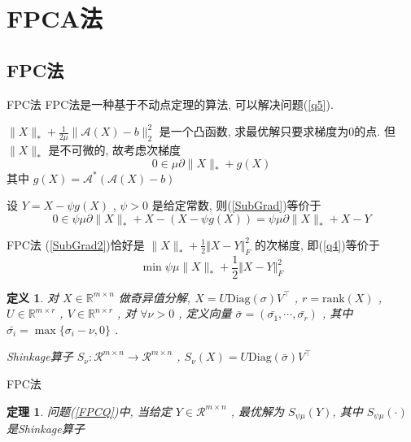 \documentclass[slidestop,compress,mathserif,UTF8]{beamer}
\newtheorem{theo}{\bf \textcolor[rgb]{0.8,0,0}{定理}}[section]  %
\newtheorem{define}{\bf \textcolor[rgb]{0.8,0,0}{定义}}[section]
\numberwithin{equation}{section}
\begin{document}
    \section{FPCA法}\label{section4}
        \subsection{FPC法}        
            \begin{frame}[t]{FPC法}
                FPC法是一种基于不动点定理的算法, 可以解决问题(\ref{q5}).

                $\lVert{X}\rVert_*+\frac{1}{2\mu}\lVert{\mathcal{A}(X)-b}\rVert_2^2$ 是一个凸函数, 求最优解只要求梯度为0的点. 但 $\lVert{X}\rVert_*$ 是不可微的, 故考虑次梯度
                \begin{equation}\label{SubGrad}
                    0 \in \mu \partial \lVert{X}\rVert_* + g(X)
                \end{equation}
                \small{其中 $g(X) = \mathcal{A}^*(\mathcal{A}(X) - b)$}\normalsize

                设 $Y = X - \psi g(X)$ , $\psi > 0$ 是给定常数, 则(\ref{SubGrad})等价于
                \begin{equation}\label{SubGrad2}
                    0 \in \psi \mu \partial \lVert{X}\rVert_* + X - (X - \psi g(X)) = \psi \mu \partial \lVert{X}\rVert_* + X -Y
                \end{equation}
            \end{frame}
            \begin{frame}[t]{FPC法}
                (\ref{SubGrad2})恰好是 $\lVert{X}\rVert_* + \frac{1}{2} \Vert{X - Y}\Vert^2_F$ 的次梯度, 即(\ref{q4})等价于 
                \begin{equation}\label{FPCQ}
                    \min \psi \mu \lVert{X}\rVert_* + \frac{1}{2} \Vert{X - Y}\Vert^2_F
                \end{equation}

                \begin{define}
                    对 $X \in \mathbb{R}^{m \times n}$ 做奇异值分解, $X = U \text{Diag}(\sigma) V ^\top$ , $r = \text{rank}(X)$ , $U \in \mathbb{R}^{m \times r}$ , $V \in \mathbb{R}^{n \times r}$ , 对 $\forall \nu > 0$ , 定义向量 $\bar{\sigma} = (\bar{\sigma_1}, \cdots, \bar{\sigma_r})$ , 其中$\bar{\sigma_i} = \max \{\sigma_i - \nu, 0\}$ .
                    
                    Shinkage算子 $S_\nu: \mathcal{R}^{m \times n} \rightarrow \mathcal{R}^{m \times n}$ , $S_\nu(X) = U \text{Diag}(\bar{\sigma}) V ^\top$
                \end{define}
            \end{frame}
            \begin{frame}[t]{FPC法}
                \begin{theo}
                    问题(\ref{FPCQ})中, 当给定 $Y \in \mathcal{R}^{m \times n}$ , 最优解为 $S_{\psi \mu}(Y)$, 其中 $S_{\psi \mu}(\cdot)$ 是Shinkage算子
                \end{theo}
            \end{frame}
\end{document}
